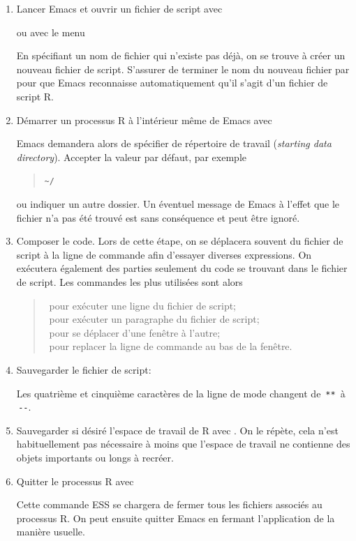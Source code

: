 \begin{enumerate}
\item Lancer Emacs et ouvrir un fichier de script avec
  \begin{quote}
  \end{quote}
  ou avec le menu
  \begin{quote}
  \end{quote}
  En spécifiant un nom de fichier qui n'existe pas déjà, on se trouve
  à créer un nouveau fichier de script. S'assurer de terminer le nom
  du nouveau fichier par  pour que Emacs reconnaisse
  automatiquement qu'il s'agit d'un fichier de script R.
\item Démarrer un processus R à l'intérieur même de Emacs avec
  \begin{quote}
    \returnkey
  \end{quote}
  Emacs demandera alors de spécifier de répertoire de travail
  (\emph{starting data directory}). Accepter la valeur par défaut, par
  exemple
  \begin{quote}
    \verb=~/ =\returnkey
  \end{quote}
  ou indiquer un autre dossier. Un éventuel message de Emacs à l'effet
  que le fichier  n'a pas été trouvé est sans
  conséquence et peut être ignoré.
\item Composer le code. Lors de cette étape, on se déplacera souvent
  du fichier de script à la ligne de commande afin d'essayer diverses
  expressions. On exécutera également des parties seulement du code se
  trouvant dans le fichier de script. Les commandes les plus utilisées
  sont alors
  \begin{quote}
    \ pour exécuter une ligne du fichier de script; \\
    \ pour exécuter un paragraphe du fichier de script; \\
    \ pour se déplacer d'une fenêtre à l'autre; \\
    \ pour replacer la ligne de commande au bas de la
    fenêtre.
  \end{quote}
\item Sauvegarder le fichier de script:
  \begin{quote}
  \end{quote}
  Les quatrième et cinquième caractères de la ligne de mode changent
  de \,\verb|**|\, à \,\verb|--|.
\item Sauvegarder si désiré l'espace de travail de R avec
  . On le répète, cela
  n'est habituellement pas nécessaire à moins que l'espace de travail
  ne contienne des objets importants ou longs à recréer.
\item Quitter le processus R avec
  \begin{quote}
  \end{quote}
  Cette commande ESS se chargera de fermer tous les fichiers associés
  au processus R. On peut ensuite quitter Emacs en fermant
  l'application de la manière usuelle.
\end{enumerate}



